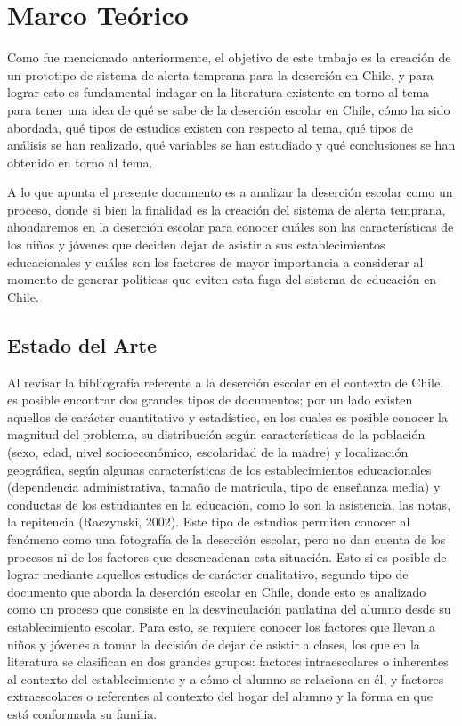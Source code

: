 \chapter{Marco Teórico}
\label{ch:marcoteorico}
Como fue mencionado anteriormente, el objetivo de este trabajo es la creación de un prototipo de sistema de alerta temprana para la deserción en Chile, y para lograr esto es fundamental indagar en la literatura existente en torno al tema para tener una idea de qué se sabe de la deserción escolar en Chile, cómo ha sido abordada, qué tipos de estudios existen con respecto al tema, qué tipos de análisis se han realizado, qué variables se han estudiado y qué conclusiones se han obtenido en torno al tema. 

A lo que apunta el presente documento es a analizar la deserción escolar como un proceso, donde si bien la finalidad es la creación del sistema de alerta temprana, ahondaremos en la deserción escolar para conocer cuáles son las características de los niños y jóvenes que deciden dejar de asistir a sus establecimientos educacionales y cuáles son los factores de mayor importancia a considerar al momento de generar políticas que eviten esta fuga del sistema de educación en Chile. 

\section{Estado del Arte}

Al revisar la bibliografía  referente a la deserción escolar en el contexto de Chile, es posible encontrar dos grandes tipos de documentos; por un lado existen aquellos de carácter cuantitativo y estadístico, en los cuales es posible conocer la magnitud del problema, su distribución según características de la población (sexo, edad, nivel socioeconómico, escolaridad de la madre) y localización geográfica, según algunas características de los establecimientos educacionales (dependencia administrativa, tamaño de matricula, tipo de enseñanza media) y conductas de los estudiantes en la educación, como lo son la asistencia, las notas, la repitencia (Raczynski, 2002). Este tipo de estudios permiten conocer al fenómeno como una fotografía de la deserción escolar, pero no dan cuenta de los procesos ni de los factores que desencadenan esta situación. Esto si es posible de lograr mediante aquellos estudios de carácter cualitativo, segundo tipo de documento que aborda la deserción escolar en Chile, donde esto es analizado como un proceso que consiste en la desvinculación paulatina del alumno desde su establecimiento escolar. Para esto, se requiere conocer los factores que llevan a niños y jóvenes a tomar la decisión de dejar de asistir a clases, los que en la literatura se clasifican en dos grandes grupos: factores intraescolares o inherentes al contexto del establecimiento y a cómo el alumno se relaciona en él, y factores extraescolares o referentes al contexto del hogar del alumno y la forma en que está conformada su familia.  

